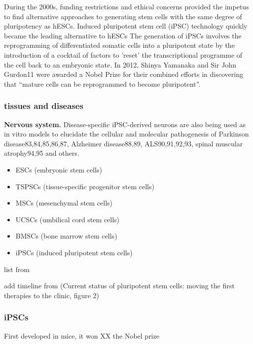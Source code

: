 During the 2000s, funding restrictions and ethical concerns provided the impetus to find alternative approaches to generating stem cells with the same degree of pluripotency as hESCs. 
Induced pluripotent stem cell (iPSC) technology quickly became the leading alternative to hESCs \cite{takahashi2006induction, takahashi2007induction, yu2007induced}
The generation of iPSCs involves the reprogramming of differentiated somatic cells into a pluripotent state by the introduction of a cocktail of factors to 'reset' the transcriptional programme of the cell back to an embryonic state. 
In 2012, Shinya Yamanaka and Sir John Gurdon11 were awarded a Nobel Prize for their combined efforts in discovering that “mature cells can be reprogrammed to become pluripotent”. 

\subsubsection{tissues and diseases}

\textbf{Nervous system.}
Disease-specific iPSC-derived neurons are also being used as in vitro models to elucidate the cellular and molecular pathogenesis of Parkinson disease83,84,85,86,87, Alzheimer disease88,89, ALS90,91,92,93, spinal muscular atrophy94,95 and others.


\begin{itemize}
    \item ESCs (embryonic stem cells)
    \item TSPSCs (tissue-specific progenitor stem cells)
    \item MSCs (mesenchymal stem cells)
    \item UCSCs (umbilical cord stem cells)
    \item BMSCs (bone marrow stem cells)
    \item iPSCs (induced pluripotent stem cells)
\end{itemize}

list from \cite{mahla2016stem}


add timeline from (Current status of pluripotent stem cells: moving the first therapies to the clinic,  figure 2)

\cite{kimbrel2015current}

\subsubsection{iPSCs}

First developed in mice, it won XX the Nobel prize

